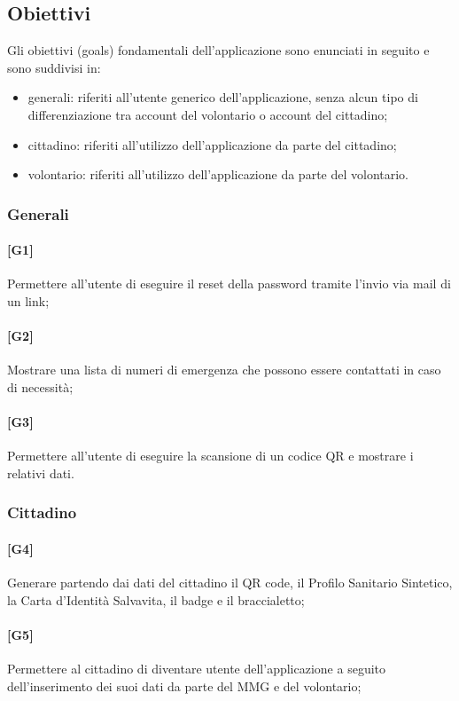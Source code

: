 \documentclass[12pt,a4paper,twoside,openright,titlepage]{book}
\begin{document}
\subsection{Obiettivi}
Gli obiettivi (goals) fondamentali dell'applicazione sono enunciati in seguito e sono suddivisi in:
\begin{itemize}
\item generali: riferiti all'utente generico dell'applicazione, senza alcun tipo di differenziazione tra account del volontario o account del cittadino;
\item cittadino: riferiti all'utilizzo dell'applicazione da parte del cittadino;
\item volontario: riferiti all'utilizzo dell'applicazione da parte del volontario.
\end{itemize}

\subsubsection{Generali}
\paragraph{[G1]} Permettere all'utente di eseguire il reset della password tramite l'invio via mail di un link;
\paragraph{[G2]} Mostrare una lista di numeri di emergenza che possono essere contattati in caso di necessità;
\paragraph{[G3]} Permettere all'utente di eseguire la scansione di un codice QR e mostrare i relativi dati.

\subsubsection{Cittadino}
\paragraph{[G4]} Generare partendo dai dati del cittadino il QR code, il Profilo Sanitario Sintetico, la Carta d'Identità Salvavita, il badge e il braccialetto;
\paragraph{[G5]} Permettere al cittadino di diventare utente dell'applicazione a seguito dell'inserimento dei suoi dati da parte del MMG e del volontario;
\end{document}
